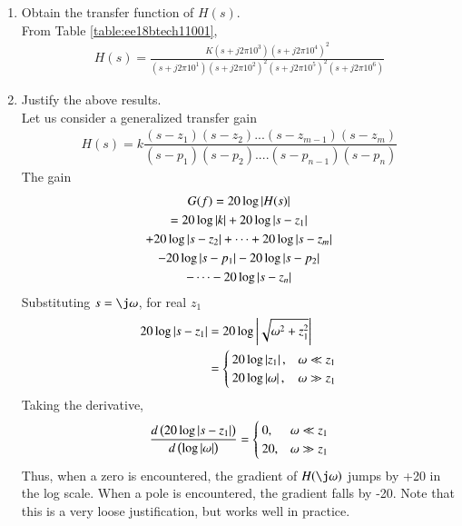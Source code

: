 \begin{enumerate}[label=\thesection.\arabic*.,ref=\thesection.\theenumi]

\item Obtain the transfer function of $H(s)$.
\\
\solution From Table \ref{table:ee18btech11001},
{\footnotesize
\begin{align}
\label{eq:ee18btech11001_system}
	H(s) = \frac{K(s+j2\pi 10^{3})(s+j2\pi 10^{4})^{2}}{(s+j2\pi 10^{1})(s+j2\pi 10^{2})^{2}(s+j2\pi 10^{5})^{2}(s+j2\pi 10^{6})}
\end{align}
}
\item Justify the above results.
\\
\solution
Let us consider a generalized transfer gain
\begin{align}
	H(s) = k \dfrac{(s-z_{1})(s-z_{2})...(s-z_{m-1})(s-z_{m})}{(s-p_{1})(s-p_{2})....(s-p_{n-1})(s-p_{n})}
\end{align}
The gain
\begin{multline}
	G(f) = 20\log\left\vert H(s)\right\vert 
\\
= 20\log \left\vert k\right\vert + 20\log \left\vert s-z_{1}\right\vert 
	    \\
	    + 20\log \left\vert s-z_{2}\right\vert + \dots + 20\log \left\vert s-z_{m}\right\vert 
\\
- 20\log \left\vert s-p_{1}\right\vert 
	    - 20\log \left\vert s-p_{2}\right\vert 
	    \\
- \dots - 20\log \left\vert s-z_{n}\right\vert 
\end{multline}
%
Substituting $s = \j \omega$, for real $z_1$
\begin{align}
	20\log \left\vert s-z_{1}\right\vert &= 20\log \left\vert\sqrt{\omega^{2} + z_{1}^{2}}\right\vert
\\
&= 
\begin{cases}
20 \log \left\vert z_{1}\right\vert, & \omega \ll z_{1}
\\
20 \log \left\vert\omega\right\vert, & \omega \gg z_{1}
\end{cases}
\end{align}
%
Taking the derivative, 
\begin{align}
	\frac{d\left(20\log \left\vert s-z_{1}\right\vert\right)}{d\left(\log \left\vert\omega\right\vert\right)} 
= 
\begin{cases}
0, & \omega \ll z_{1}
\\
20, & \omega \gg z_{1}
\end{cases}
\end{align}
%
Thus, when a zero is encountered, the gradient of $H(\j\omega)$ jumps by +20 in the log scale.  When a pole is encountered, the gradient falls by -20. Note that this is a very loose justification, but works well in practice.


\end{enumerate}
